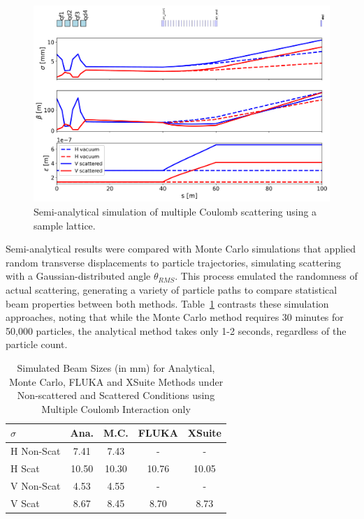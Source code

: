 \documentclass[a4paper,
               biblatex,     %
               ]{jacow}
\begin{document}
\begin{figure}[!htb]
   \centering
   \includegraphics*[width=1.0\columnwidth]{THPR032_f2.png}
   \caption{Semi-analytical simulation of multiple Coulomb scattering using a sample lattice.}
   \label{fig:simple_line}
\end{figure}

Semi-analytical results were compared with Monte Carlo simulations that applied random transverse displacements to particle trajectories, simulating scattering with a Gaussian-distributed angle $\theta_{RMS}$. This process emulated the randomness of actual scattering, generating a variety of particle paths to compare statistical beam properties between both methods. Table~\ref{tab:sigma_comparison} contrasts these simulation approaches, noting that while the Monte Carlo method requires 30 minutes for 50,000 particles, the analytical method takes only 1-2 seconds, regardless of the particle count. 

\begin{table}[ht]
\centering
\caption{Simulated Beam Sizes (in mm) for Analytical, Monte Carlo, FLUKA and XSuite Methods under Non-scattered and Scattered Conditions using Multiple Coulomb Interaction only}
\begin{tabular}{lcccc}
\hline
$\sigma$ & Ana. & M.C. & FLUKA & XSuite \\
\hline
H Non-Scat & 7.41 & 7.43 & - & -\\
H Scat & 10.50 & 10.30 & 10.76 & 10.05 \\
V Non-Scat & 4.53 & 4.55 & - & -\\
V Scat & 8.67 & 8.45 & 8.70 & 8.73 \\
\hline
\end{tabular}
\label{tab:sigma_comparison}
\end{table}
\end{document}
